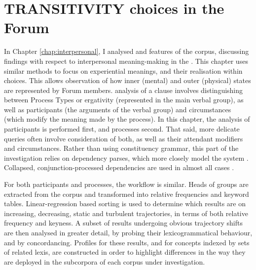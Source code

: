 
\chapter{TRANSITIVITY choices in the Forum} \label{chap:experiential}

In Chapter \ref{chap:interpersonal}, I analysed  and  features of the \gls{corpus}, discussing findings with respect to interpersonal meaning\hyp{}making in the . This chapter uses similar methods to focus on experiential meanings, and their realisation within  choices. This allows observation of how inner (mental) and outer (physical) states are represented by \gls{Forum} \glspl{member}.  analysis of a clause involves distinguishing between Process Types or ergativity (represented in the main verbal group), as well as participants (the arguments of the verbal group) and circumstances (which modify the meaning made by the process). In this chapter, the analysis of participants is performed first, and processes second. That said, more delicate queries often involve consideration of both, as well as their attendant modifiers and circumstances. Rather than using constituency grammar, this part of the investigation relies on dependency parses, which more closely model the  system \cite{costetchi_method_2013}. Collapsed, conjunction\hyp{}processed dependencies are used in almost all cases \cite[see][]{manning_stanford_2014}.

For both participants and processes, the workflow is similar. Heads of groups are extracted from the \gls{corpus} and transformed into relative frequencies and keyword tables. Linear\hyp{}regression based sorting is used to determine which results are on increasing, decreasing, static and turbulent trajectories, in terms of both relative frequency and keyness. A subset of results undergoing obvious trajectory shifts are then analysed in greater detail, by probing their lexicogrammatical behaviour, and by concordancing. Profiles for these results, and for concepts indexed by sets of related lexis, are constructed in order to highlight differences in the way they are deployed in the subcorpora of each \gls{corpus} under investigation.

